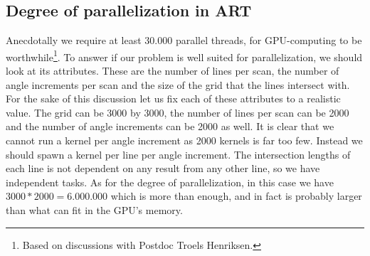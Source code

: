 \subsection{Degree of parallelization in ART} 
\label{sec:degOfPar}
Anecdotally we require at least $30.000$ parallel threads, for GPU-computing to be worthwhile\footnote{Based on discussions with Postdoc Troels Henriksen.}. To answer if our problem is well suited for parallelization, we should look at its attributes. These are the number of lines per scan, the number of angle increments per scan and the size of the grid that the lines intersect with. For the sake of this discussion let us fix each of these attributes to a realistic value. The grid can be 3000 by 3000, the number of lines per scan can be 2000 and the number of angle increments can be 2000 as well. It is clear that we cannot run a kernel per angle increment as 2000 kernels is far too few. Instead we should spawn a kernel per line per angle increment. The intersection lengths of each line is not dependent on any result from any other line, so we have independent tasks. As for the degree of parallelization, in this case we have $3000 * 2000 = 6.000.000$ which is more than enough, and in fact is probably larger than what can fit in the GPU's memory.

